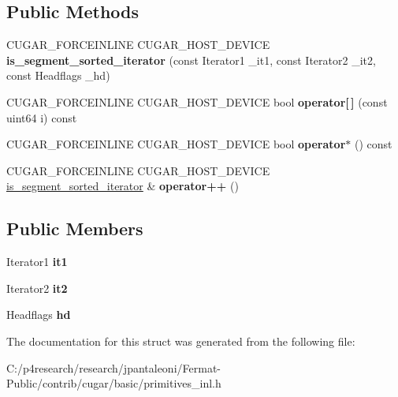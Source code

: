\subsection*{Public Methods}
\begin{DoxyCompactItemize}
\item 
\mbox{\label{structcugar_1_1is__segment__sorted__iterator_afa4764445f7644c065e37c6a0c561203}} 
C\+U\+G\+A\+R\+\_\+\+F\+O\+R\+C\+E\+I\+N\+L\+I\+NE C\+U\+G\+A\+R\+\_\+\+H\+O\+S\+T\+\_\+\+D\+E\+V\+I\+CE {\bfseries is\+\_\+segment\+\_\+sorted\+\_\+iterator} (const Iterator1 \+\_\+it1, const Iterator2 \+\_\+it2, const Headflags \+\_\+hd)
\item 
\mbox{\label{structcugar_1_1is__segment__sorted__iterator_aa4728b84a79b8d485690180b4d05703a}} 
C\+U\+G\+A\+R\+\_\+\+F\+O\+R\+C\+E\+I\+N\+L\+I\+NE C\+U\+G\+A\+R\+\_\+\+H\+O\+S\+T\+\_\+\+D\+E\+V\+I\+CE bool {\bfseries operator\mbox{[}$\,$\mbox{]}} (const uint64 i) const
\item 
\mbox{\label{structcugar_1_1is__segment__sorted__iterator_aafdf0960c302ed40bdc178391a335224}} 
C\+U\+G\+A\+R\+\_\+\+F\+O\+R\+C\+E\+I\+N\+L\+I\+NE C\+U\+G\+A\+R\+\_\+\+H\+O\+S\+T\+\_\+\+D\+E\+V\+I\+CE bool {\bfseries operator$\ast$} () const
\item 
\mbox{\label{structcugar_1_1is__segment__sorted__iterator_a99a73b7bc263941af4470f5e71baaaeb}} 
C\+U\+G\+A\+R\+\_\+\+F\+O\+R\+C\+E\+I\+N\+L\+I\+NE C\+U\+G\+A\+R\+\_\+\+H\+O\+S\+T\+\_\+\+D\+E\+V\+I\+CE \hyperlink{structcugar_1_1is__segment__sorted__iterator}{is\+\_\+segment\+\_\+sorted\+\_\+iterator} \& {\bfseries operator++} ()
\end{DoxyCompactItemize}
\subsection*{Public Members}
\begin{DoxyCompactItemize}
\item 
\mbox{\label{structcugar_1_1is__segment__sorted__iterator_abb197d29df6998f40bdfc3d4f922b92a}} 
Iterator1 {\bfseries it1}
\item 
\mbox{\label{structcugar_1_1is__segment__sorted__iterator_ac22597e305eea555adb421de9b7317d0}} 
Iterator2 {\bfseries it2}
\item 
\mbox{\label{structcugar_1_1is__segment__sorted__iterator_aad20566e6208a8f7b81801708ea78c5b}} 
Headflags {\bfseries hd}
\end{DoxyCompactItemize}


The documentation for this struct was generated from the following file\+:\begin{DoxyCompactItemize}
\item 
C\+:/p4research/research/jpantaleoni/\+Fermat-\/\+Public/contrib/cugar/basic/primitives\+\_\+inl.\+h\end{DoxyCompactItemize}
